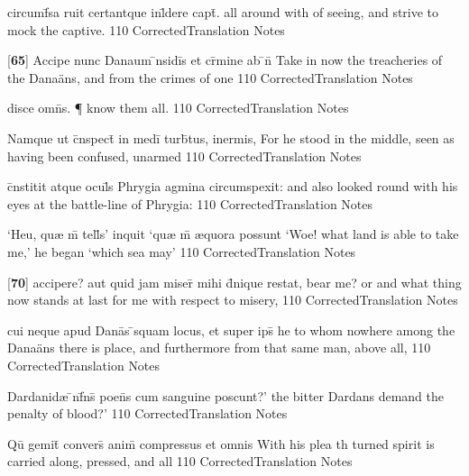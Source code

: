 \latline
  {circumf\={}sa ruit certantque inl\={}dere capt\={}.}
  { all around with of seeing, and strive to mock the captive. }
  {110}
  { CorrectedTranslation }
  { Notes }


\latline
  {[\textbf{65}] Accipe nunc Danaum \={\macron {\i}}nsidi\={}s et cr\={\macron {\i}}mine ab \={}n\={}}
  { Take in now the treacheries of the Dana\"ans, and from the crimes of one }
  {110}
  { CorrectedTranslation }
  { Notes }


\latline
  {disce omn\={\macron {\i}}s. \P}
  { know them all. }
  {110}
  { CorrectedTranslation }
  { Notes }


\latline
  {Namque ut c\={}nspect\={} in medi\={} turb\={}tus, inermis, }
  { For he stood in the middle, seen as having been confused, unarmed }
  {110}
  { CorrectedTranslation }
  { Notes }


\latline
  {c\={}nstitit atque ocul\={\macron {\i}}s Phrygia agmina circumspexit:}
  { and also looked round with his eyes at the battle-line of Phrygia: }
  {110}
  { CorrectedTranslation }
  { Notes }


\latline
  {`Heu, qu{\ae} m\={} tell\={}s' inquit `qu{\ae} m\={} {\ae}quora possunt}
  { `Woe!  what land is able to take me,' he began `which sea may'  }
  {110}
  { CorrectedTranslation }
  { Notes }


\latline
  {[\textbf{70}] accipere? aut quid jam miser\={} mihi d\={}nique restat,}
  { bear me? or and what thing now stands at last for me with respect to misery,  }
  {110}
  { CorrectedTranslation }
  { Notes }


\latline
  {cui neque apud Dana\={}s \={}squam locus, et super ips\={\macron {\i}}}
  { he to whom nowhere among the Dana\"ans there is place, and furthermore from that same man, above all, }
  {110}
  { CorrectedTranslation }
  { Notes }


\latline
  {Dardanid{\ae} \={\macron {\i}}nf\={}ns\={\macron {\i}} poen\={}s cum sanguine poscunt?'}
  { the bitter Dardans demand the penalty of blood?'  }
  {110}
  { CorrectedTranslation }
  { Notes }


\latline
  {Qu\={} gemit\={} convers\={\macron {\i}} anim\={\macron {\i}} compressus et omnis}
  { With his plea th turned spirit is carried along, pressed, and all  }
  {110}
  { CorrectedTranslation }
  { Notes }


